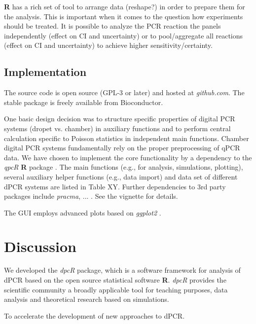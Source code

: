 \documentclass{bioinfo}
\begin{document}
 

\textbf{R} has a rich set of tool to arrange data (reshape?) in order to prepare them for 
the analysis. This is important when it comes to the question how experiments 
should be treated. It is possible to analyze the PCR reaction the panels 
independently (effect on CI and uncertainty) or to pool/aggregate all reactions 
(effect on CI and uncertainty) to achieve higher sensitivity/certainty.


\begin{methods}
\section{Implementation}

The source code is open source (GPL-3 or later) and hosted at \textit{github.com}. The stable package is freely 
available from Bioconductor.

One basic design decision was to structure specific properties of digital PCR 
systems (dropet vs. chamber) in auxiliary functions and to perform central 
calculation specific to Poisson statistics in independent main functions. 
Chamber digital PCR systems fundamentally rely on the proper preprocessing of 
qPCR data. We have chosen to implement the core functionality by a dependency to 
the \textit{qpcR} \textbf{R} package \cite{ritz_qpcr_2008}. The main functions (e.g., for analysis, 
simulations, plotting), several auxiliary helper functions (e.g., data import) 
and data set of different dPCR systems are listed in Table XY. Further 
dependencies to 3rd party packages include \textit{pracma}, ... . See the vignette for 
details.

The GUI employs advanced plots based on \textit{ggplot2} \cite{kahle_wickham_2013}.



\end{methods}


\section{Discussion}

We developed the \textit{dpcR} package, which is a software framework for analysis of 
dPCR based on the open source statistical software \textbf{R}. \textit{dpcR} provides the scientific 
community a broadly applicable tool for teaching purposes, data analysis and theoretical research based on simulations. 

To accelerate the development of new approaches to dPCR. 
\end{document}
